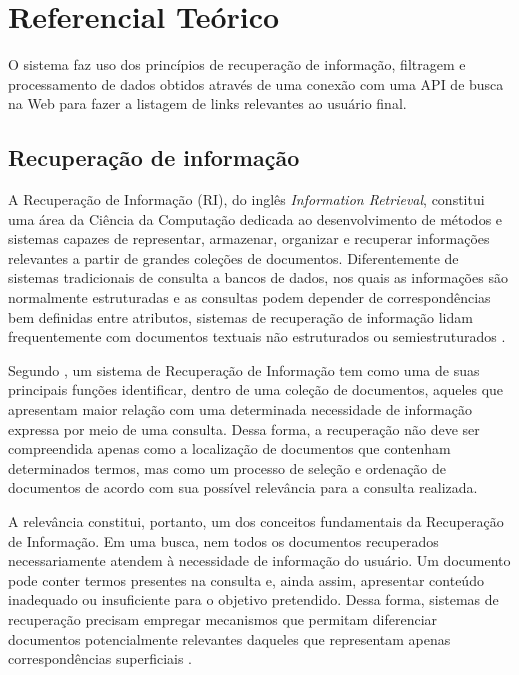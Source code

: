\chapter[REFERENCIAL TEÓRICO]{Referencial Teórico}

O sistema faz uso dos princípios de recuperação de informação, filtragem e processamento de dados obtidos através de uma conexão com uma API de busca na Web para fazer a listagem de links relevantes ao usuário final.

\section{Recuperação de informação}

A Recuperação de Informação (RI), do inglês \textit{Information Retrieval}, constitui uma área da Ciência da Computação dedicada ao desenvolvimento de métodos e sistemas capazes de representar, armazenar, organizar e recuperar informações relevantes a partir de grandes coleções de documentos. Diferentemente de sistemas tradicionais de consulta a bancos de dados, nos quais as informações são normalmente estruturadas e as consultas podem depender de correspondências bem definidas entre atributos, sistemas de recuperação de informação lidam frequentemente com documentos textuais não estruturados ou semiestruturados \cite{manning2008}.

Segundo , um sistema de Recuperação de Informação tem como uma de suas principais funções identificar, dentro de uma coleção de documentos, aqueles que apresentam maior relação com uma determinada necessidade de informação expressa por meio de uma consulta. Dessa forma, a recuperação não deve ser compreendida apenas como a localização de documentos que contenham determinados termos, mas como um processo de seleção e ordenação de documentos de acordo com sua possível relevância para a consulta realizada.

A relevância constitui, portanto, um dos conceitos fundamentais da Recuperação de Informação. Em uma busca, nem todos os documentos recuperados necessariamente atendem à necessidade de informação do usuário. Um documento pode conter termos presentes na consulta e, ainda assim, apresentar conteúdo inadequado ou insuficiente para o objetivo pretendido. Dessa forma, sistemas de recuperação precisam empregar mecanismos que permitam diferenciar documentos potencialmente relevantes daqueles que representam apenas correspondências superficiais \cite{baeza2011}.

